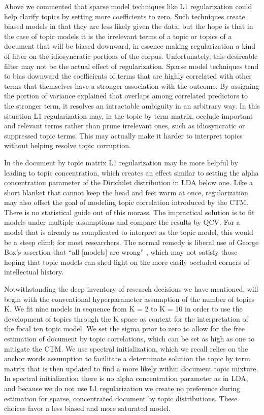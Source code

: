 \documentclass[]{book}
\theoremstyle{definition}
\theoremstyle{definition}
\theoremstyle{definition}
\theoremstyle{remark}
\begin{document}
Above we commented that sparse model techniques like L1 regularization
could help clarify topics by setting more coefficients to zero. Such
techniques create biased models in that they are less likely given the
data, but the hope is that in the case of topic models it is the
irrelevant terms of a topic or topics of a document that will be biased
downward, in essence making regularization a kind of filter on the
idiosyncratic portions of the corpus. Unfortunately, this desireable
filter may not be the actual effect of regularization. Sparse model
techniques tend to bias downward the coefficients of terms that are
highly correlated with other terms that themselves have a stronger
association with the outcome. By assigning the portion of variance
explained that overlaps among correlated predictors to the stronger
term, it resolves an intractable ambiguity in an arbitrary way. In this
situation L1 regularization may, in the topic by term matrix, occlude
important and relevant terms rather than prune irrelevant ones, such as
idiosyncratic or suppressed topic terms. This may actually make it
harder to interpret topics without helping resolve topic corruption.

In the document by topic matrix L1 regularization may be more helpful by
leading to topic concentration, which creates an effect similar to
setting the alpha concentration parameter of the Dirichilet distribution
in LDA below one. Like a short blanket that cannot keep the head and
feet warm at once, regularization may also offset the goal of modeling
topic correlation introduced by the CTM. There is no statistical guide
out of this morass. The impractical solution is to fit models under
multiple assumptions and compare the results by QCV. For a model that is
already as complicated to interpret as the topic model, this would be a
steep climb for most researchers. The normal remedy is liberal use of
George Box's assertion that ``all {[}models{]} are wrong''
\citep[582]{DiMaggio2013Exploiting}, which may not satisfy those hoping
that topic models can shed light on the more easily occluded corners of
intellectual history.

Notwithstanding the deep inventory of research decisions we have
mentioned, will begin with the conventional hyperparameter assumption of
the number of topics K. We fit nine models in sequence from K = 2 to K =
10 in order to use the development of topics through the K space as
context for the interpretation of the focal ten topic model. We set the
sigma prior to zero to allow for the free estimation of document by
topic correlations, which can be set as high as one to mitigate the CTM.
We use spectral initialization, which we recall relies on the anchor
words assumption to facilitate a determinate solution the topic by term
matrix that is then updated to find a more likely within document topic
mixture. In spectral initialization there is no alpha concentration
parameter as in LDA, and because we do not use L1 regularization we
create no preference during estimation for sparse, concentrated document
by topic distributions. These choices favor a less biased and more
saturated model.
\end{document}
